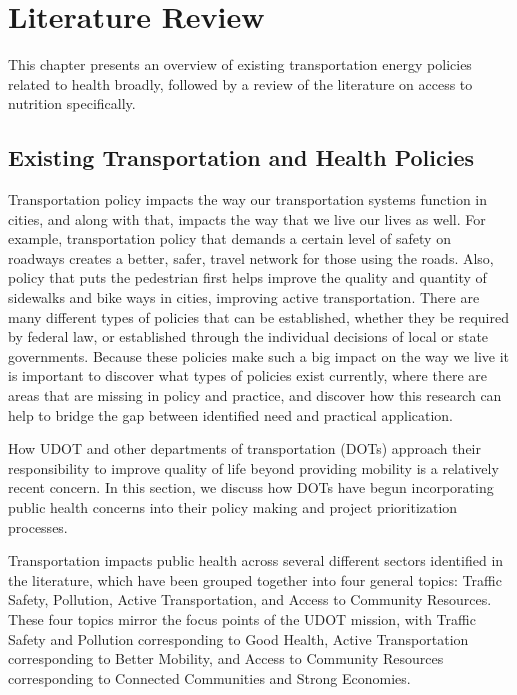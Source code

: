 \documentclass[
  letterpaper,
  authoryear,
  review,
  3p]{elsarticle}
\begin{document}
\hypertarget{sec-literature}{%
\section{Literature Review}\label{sec-literature}}

This chapter presents an overview of existing transportation energy
policies related to health broadly, followed by a review of the
literature on access to nutrition specifically.

\hypertarget{existing-transportation-and-health-policies}{%
\subsection{Existing Transportation and Health
Policies}\label{existing-transportation-and-health-policies}}

Transportation policy impacts the way our transportation systems
function in cities, and along with that, impacts the way that we live
our lives as well. For example, transportation policy that demands a
certain level of safety on roadways creates a better, safer, travel
network for those using the roads. Also, policy that puts the pedestrian
first helps improve the quality and quantity of sidewalks and bike ways
in cities, improving active transportation. There are many different
types of policies that can be established, whether they be required by
federal law, or established through the individual decisions of local or
state governments. Because these policies make such a big impact on the
way we live it is important to discover what types of policies exist
currently, where there are areas that are missing in policy and
practice, and discover how this research can help to bridge the gap
between identified need and practical application.

How UDOT and other departments of transportation (DOTs) approach their
responsibility to improve quality of life beyond providing mobility is a
relatively recent concern. In this section, we discuss how DOTs have
begun incorporating public health concerns into their policy making and
project prioritization processes.

Transportation impacts public health across several different sectors
identified in the literature, which have been grouped together into four
general topics: Traffic Safety, Pollution, Active Transportation, and
Access to Community Resources. These four topics mirror the focus points
of the UDOT mission, with Traffic Safety and Pollution corresponding to
Good Health, Active Transportation corresponding to Better Mobility, and
Access to Community Resources corresponding to Connected Communities and
Strong Economies.
\end{document}
